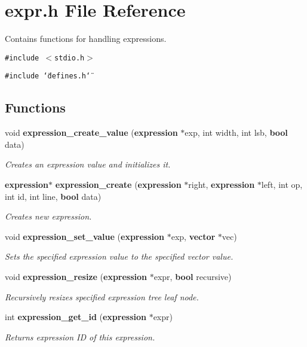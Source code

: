 \section{expr.h File Reference}
\label{expr_8h}
Contains functions for handling expressions. 


{\tt \#include $<$stdio.h$>$}\par
{\tt \#include \char`\"{}defines.h\char`\"{}}\par
\subsection*{Functions}
\begin{CompactItemize}
\item 
void {\bf expression\_\-create\_\-value} ({\bf expression} $\ast$exp, int width, int lsb, {\bf bool} data)
\begin{CompactList}\small\item\em Creates an expression value and initializes it.\item\end{CompactList}\item 
{\bf expression}$\ast$ {\bf expression\_\-create} ({\bf expression} $\ast$right, {\bf expression} $\ast$left, int op, int id, int line, {\bf bool} data)
\begin{CompactList}\small\item\em Creates new expression.\item\end{CompactList}\item 
void {\bf expression\_\-set\_\-value} ({\bf expression} $\ast$exp, {\bf vector} $\ast$vec)
\begin{CompactList}\small\item\em Sets the specified expression value to the specified vector value.\item\end{CompactList}\item 
void {\bf expression\_\-resize} ({\bf expression} $\ast$expr, {\bf bool} recursive)
\begin{CompactList}\small\item\em Recursively resizes specified expression tree leaf node.\item\end{CompactList}\item 
int {\bf expression\_\-get\_\-id} ({\bf expression} $\ast$expr)
\begin{CompactList}\small\item\em Returns expression ID of this expression.\item\end{CompactList}\item 

\end{CompactItemize}
